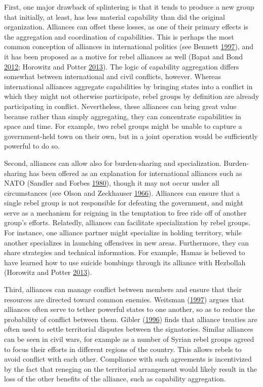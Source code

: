 \documentclass[12pt,]{book}
\theoremstyle{definition}
\theoremstyle{definition}
\theoremstyle{definition}
\theoremstyle{remark}
\begin{document}
First, one major drawback of splintering is that it tends to produce a
new group that initially, at least, has less material capability than
did the original organization. Alliances can offset these losses, as one
of their primary effects is the aggregation and coordination of
capabilities. This is perhaps the most common conception of alliances in
international politics (see Bennett
\protect\hyperlink{ref-Bennett1997}{1997}), and it has been proposed as
a motive for rebel alliances as well (Bapat and Bond
\protect\hyperlink{ref-Bapat2012}{2012}; Horowitz and Potter
\protect\hyperlink{ref-Horowitz2013}{2013}). The logic of capability
aggregation differs somewhat between international and civil conflicts,
however. Whereas international alliances aggregate capabilities by
bringing states into a conflict in which they might not otherwise
participate, rebel groups by definition are already participating in
conflict. Nevertheless, these alliances can bring great value because
rather than simply aggregating, they can concentrate capabilities in
space and time. For example, two rebel groups might be unable to capture
a government-held town on their own, but in a joint operation would be
sufficiently powerful to do so.

Second, alliances can allow also for burden-sharing and specialization.
Burden-sharing has been offered as an explanation for international
alliances such as NATO (Sandler and Forbes
\protect\hyperlink{ref-Sandler1980}{1980}), though it may not occur
under all circumstances (see Olson and Zeckhauser
\protect\hyperlink{ref-Olson1966}{1966}). Alliances can ensure that a
single rebel group is not responsible for defeating the government, and
might serve as a mechanism for reigning in the temptation to free ride
off of another group's efforts. Relatedly, alliances can facilitate
specialization by rebel groups. For instance, one alliance partner might
specialize in holding territory, while another specializes in launching
offensives in new areas. Furthermore, they can share strategies and
technical information. For example, Hamas is believed to have learned
how to use suicide bombings through its alliance with Hezbollah
(Horowitz and Potter \protect\hyperlink{ref-Horowitz2013}{2013}).

Third, alliances can manage conflict between members and ensure that
their resources are directed toward common enemies. Weitsman
(\protect\hyperlink{ref-Weitsman1997}{1997}) argues that alliances often
serve to tether powerful states to one another, so as to reduce the
probability of conflict between them. Gibler
(\protect\hyperlink{ref-Gibler1996}{1996}) finds that alliance treaties
are often used to settle territorial disputes between the signatories.
Similar alliances can be seen in civil wars, for example as a number of
Syrian rebel groups agreed to focus their efforts in different regions
of the country. This allows rebels to avoid conflict with each other.
Compliance with such agreements is incentivized by the fact that
reneging on the territorial arrangement would likely result in the loss
of the other benefits of the alliance, such as capability aggregation.
\end{document}
